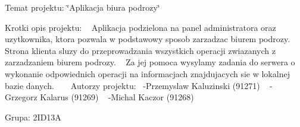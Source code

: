 Temat projektu\+: \char`\"{}\+Aplikacja biura podrozy\char`\"{}~\newline
~\newline


Krotki opis projektu\+: ~\newline
 Aplikacja podzielona na panel administratora oraz uzytkownika, ktora pozwala w podstawowy sposob zarzadzac biurem podrozy. ~\newline
 Strona klienta sluzy do przeprowadzania wszystkich operacji zwiazanych z zarzadzaniem biurem podrozy. ~\newline
 Za jej pomoca wysylamy zadania do serwera o wykonanie odpowiednich operacji na informacjach znajdujacych sie w lokalnej bazie danych. ~\newline
~\newline
 Autorzy projektu\+:~\newline
 -\/Przemyslaw Kaluzinski (91271) ~\newline
 -\/Grzegorz Kalarus (91269) ~\newline
 -\/Michal Kaczor (91268) ~\newline
~\newline


Grupa\+: 2ID13A 